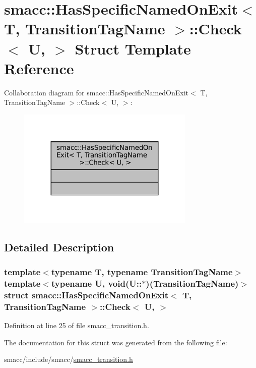 \hypertarget{structsmacc_1_1HasSpecificNamedOnExit_1_1Check}{}\section{smacc\+:\+:Has\+Specific\+Named\+On\+Exit$<$ T, Transition\+Tag\+Name $>$\+:\+:Check$<$ U, $>$ Struct Template Reference}
\label{structsmacc_1_1HasSpecificNamedOnExit_1_1Check}


Collaboration diagram for smacc\+:\+:Has\+Specific\+Named\+On\+Exit$<$ T, Transition\+Tag\+Name $>$\+:\+:Check$<$ U, $>$\+:
\nopagebreak
\begin{figure}[H]
\begin{center}
\leavevmode
\includegraphics[width=239pt]{structsmacc_1_1HasSpecificNamedOnExit_1_1Check__coll__graph}
\end{center}
\end{figure}


\subsection{Detailed Description}
\subsubsection*{template$<$typename T, typename Transition\+Tag\+Name$>$\newline
template$<$typename U, void(\+U\+::$\ast$)(\+Transition\+Tag\+Name)$>$\newline
struct smacc\+::\+Has\+Specific\+Named\+On\+Exit$<$ T, Transition\+Tag\+Name $>$\+::\+Check$<$ U, $>$}



Definition at line 25 of file smacc\+\_\+transition.\+h.



The documentation for this struct was generated from the following file\+:\begin{DoxyCompactItemize}
\item 
smacc/include/smacc/\hyperlink{smacc__transition_8h}{smacc\+\_\+transition.\+h}\end{DoxyCompactItemize}
